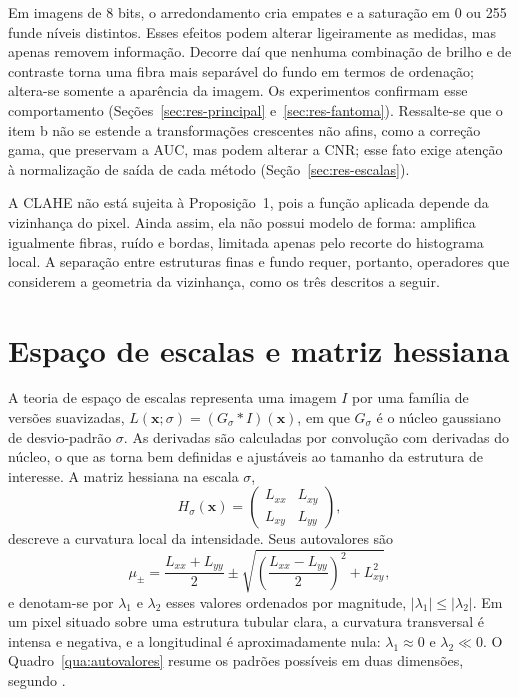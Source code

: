 \documentclass[12pt, oneside, a4paper, chapter=TITLE, section=TITLE,
               english, brazil]{abntex2}
\newcommand{\secao}[1]{\section[\texorpdfstring{\protect\MakeTextUppercase{#1}}{#1}]{#1}}
\begin{document}
Em imagens de 8 bits, o arredondamento cria empates e a saturação em 0 ou 255
funde níveis distintos. Esses efeitos podem alterar ligeiramente as medidas,
mas apenas removem informação. Decorre daí que nenhuma combinação de brilho e
de contraste torna uma fibra mais separável do fundo em termos de ordenação;
altera-se somente a aparência da imagem. Os experimentos confirmam esse
comportamento (Seções~\ref{sec:res-principal} e~\ref{sec:res-fantoma}).
Ressalte-se que o item b não se estende a transformações crescentes não
afins, como a correção gama, que preservam a AUC, mas podem alterar a CNR;
esse fato exige atenção à normalização de saída de cada método
(Seção~\ref{sec:res-escalas}).

A CLAHE \citep*{Pizer1987,Zuiderveld1994} não está sujeita à Proposição~1,
pois a função aplicada depende da vizinhança do pixel. Ainda assim, ela não
possui modelo de forma: amplifica igualmente fibras, ruído e bordas, limitada
apenas pelo recorte do histograma local. A separação entre estruturas finas e
fundo requer, portanto, operadores que considerem a geometria da vizinhança,
como os três descritos a seguir.

\secao{Espaço de escalas e matriz hessiana}

A teoria de espaço de escalas \citep*{Koenderink1984,Lindeberg1998} representa
uma imagem $I$ por uma família de versões suavizadas,
$L(\mathbf{x}; \sigma) = (G_\sigma * I)(\mathbf{x})$, em que $G_\sigma$ é o
núcleo gaussiano de desvio-padrão $\sigma$. As derivadas são calculadas por
convolução com derivadas do núcleo, o que as torna bem definidas e ajustáveis
ao tamanho da estrutura de interesse. A matriz hessiana na escala $\sigma$,
\begin{equation}
  H_\sigma(\mathbf{x}) =
  \begin{pmatrix} L_{xx} & L_{xy} \\ L_{xy} & L_{yy} \end{pmatrix},
\end{equation}
descreve a curvatura local da intensidade. Seus autovalores são
\begin{equation}
  \mu_{\pm} = \frac{L_{xx} + L_{yy}}{2} \pm
  \sqrt{\left(\frac{L_{xx} - L_{yy}}{2}\right)^{2} + L_{xy}^{2}},
\end{equation}
e denotam-se por $\lambda_1$ e $\lambda_2$ esses valores ordenados por
magnitude, $|\lambda_1| \le |\lambda_2|$. Em um pixel situado sobre uma
estrutura tubular clara, a curvatura transversal é intensa e negativa, e a
longitudinal é aproximadamente nula: $\lambda_1 \approx 0$ e
$\lambda_2 \ll 0$. O Quadro~\ref{qua:autovalores} resume os padrões possíveis
em duas dimensões, segundo \citet{Frangi1998}.
\end{document}
